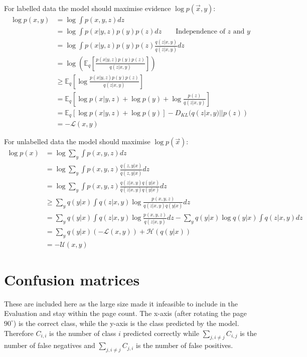 For labelled data the model should maximise evidence $\log p(\vec{x}, y)$:
\begingroup
\allowdisplaybreaks
\begin{align*}
  \log p(x, y) & = \log \int p(x, y, z) dz \\
  & = \log \int p(x|y, z)p(y)p(z) dz \qquad \text{Independence of $z$ and $y$}\\
  & = \log \int p(x|y, z)p(y)p(z) \frac{q(z|x, y)}{q(z|x, y)} dz\\
  & = \log\left(\mathbb{E}_q \left[\frac{p(x|y, z)p(y)p(z)}{q(z|x, y)}\right]\right) \\
  & \geq \mathbb{E}_q \left[\log\frac{p(x|y, z)p(y)p(z)}{q(z|x, y)}\right] \\
  & = \mathbb{E}_q \left[\log p(x|y, z) + \log p(y) + \log\frac{p(z)}{q(z|x, y)}\right] \\
  & = \mathbb{E}_q [\log p(x|y, z) + \log p(y)] - D_{KL}(q(z|x, y)||p(z)) \\
  & = -\mathcal{L}(x, y)
\end{align*}
\endgroup

For unlabelled data the model should maximise $\log p(\vec{x})$:
\begingroup
\allowdisplaybreaks
\begin{align*}
  \log p(x) & = \log \sum_{y} \int p(x, y, z) dz \\
  & = \log \sum_{y} \int p(x, y, z) \frac{q(z, y|x)}{q(z, y|x)} dz\\
  & = \log \sum_{y} \int p(x, y, z) \frac{q(z|x, y)q(y|x)}{q(z|x, y)q(y|x)} dz\\
  & \geq \sum_{y} q(y|x) \int q(z|x, y) \log\frac{p(x, y, z)}{q(z|x, y)q(y|x)} dz\\
  & = \sum_{y} q(y|x) \int q(z|x, y) \log\frac{p(x, y, z)}{q(z|x, y)} dz - \sum_{y} q(y|x) \log q(y|x) \int q(z|x, y) dz\\
  & = \sum_{y} q(y|x)(-\mathcal{L}(x, y)) + \mathcal{H}(q(y|x)) \\
  & = -\mathcal{U}(x, y)
\end{align*}
\endgroup

\chapter{Confusion matrices} \label{confusion}

These are included here as the large size made it infeasible to include in the Evaluation and stay within the page count. The x-axis (after rotating the page $90^{\circ}$) is the correct class, while the y-axis is the class predicted by the model. Therefore $C_{i,i}$ is the number of class $i$ predicted correctly while $\sum_{j, i \neq j} C_{i,j}$ is the number of false negatives and $\sum_{j, i \neq j} C_{j,i}$
is the number of false positives.

